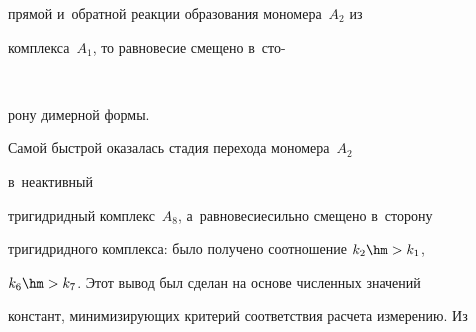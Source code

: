 прямой и~обратной реакции образования мономера~$A_2$ из 

комплекса~$A_1$, то равновесие смещено в~сто-\linebreak\vspace*{-12pt}



\pagebreak



\



\vspace*{-12pt}




  

  \noindent

  рону димерной формы. 

Самой быст\-рой оказалась стадия перехода мономера~$A_2$

   в~неактивный 

тригидрид\-ный комплекс~$A_8$, а~равновесие\linebreak сильно смещено в~сторону 

три\-гид\-рид\-но\-го комплекса: было получено соотношение $k_2\hm>k_1$, 

$k_6\hm> k_7$. Этот вывод был сделан на основе численных значений 

констант, минимизирующих критерий соответствия расчета измерению. Из 

